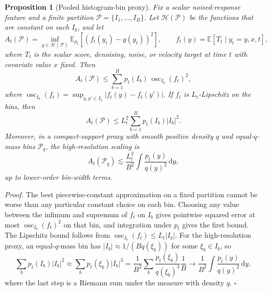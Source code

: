 \documentclass{article}
\newcommand{\E}{\mathbb{E}}
\newcommand{\dd}{\mathrm{d}}
\newtheorem{proposition}{Proposition}
\begin{document}
\begin{proposition}[Pooled histogram-bin proxy]\label{prop:histogram-bins}
Fix a scalar noised-response feature and a finite partition $\mathcal{P}=\{I_1,\ldots,I_B\}$. Let $\mathcal{H}(\mathcal{P})$ be the functions that are constant on each $I_b$, and let
\[
A_t(\mathcal{P})
=
\inf_{g\in\mathcal{H}(\mathcal{P})}
  \E_{p_t}\!\left[(f_t(y_t)-g(y_t))^2\right],
\qquad
f_t(y)=\E[T_t\mid y_t=y,x,t],
\]
where $T_t$ is the scalar score, denoising, noise, or velocity target at time $t$ with covariate value $x$ fixed. Then
\[
A_t(\mathcal{P})
\leq
\sum_{b=1}^B p_t(I_b)\,
  \operatorname{osc}_{I_b}(f_t)^2,
\]
where $\operatorname{osc}_{I_b}(f_t)=\sup_{y,y'\in I_b}|f_t(y)-f_t(y')|$. If $f_t$ is $L_t$-Lipschitz on the bins, then
\[
A_t(\mathcal{P}) \leq L_t^2\sum_{b=1}^B p_t(I_b)|I_b|^2.
\]
Moreover, in a compact-support proxy with smooth positive density $q$ and equal-$q$-mass bins $\mathcal{P}_q$, the high-resolution scaling is
\[
A_t(\mathcal{P}_q)
\lesssim
\frac{L_t^2}{B^2}\int \frac{p_t(y)}{q(y)^2}\,\dd y,
\]
up to lower-order bin-width terms.
\end{proposition}
\emph{Proof.} The best piecewise-constant approximation on a fixed partition cannot be worse than any particular constant choice on each bin. Choosing any value between the infimum and supremum of $f_t$ on $I_b$ gives pointwise squared error at most $\operatorname{osc}_{I_b}(f_t)^2$ on that bin, and integration under $p_t$ gives the first bound. The Lipschitz bound follows from $\operatorname{osc}_{I_b}(f_t)\leq L_t|I_b|$. For the high-resolution proxy, an equal-$q$-mass bin has $|I_b|\approx 1/(B q(\xi_b))$ for some $\xi_b\in I_b$, so
\[
\sum_b p_t(I_b)|I_b|^2
\approx
\sum_b p_t(\xi_b)|I_b|^3
=\frac{1}{B^2}\sum_b \frac{p_t(\xi_b)}{q(\xi_b)^3}\frac{1}{B}
\to \frac{1}{B^2}\int \frac{p_t(y)}{q(y)^2}\,\dd y,
\]
where the last step is a Riemann sum under the measure with density $q$. \hfill$\square$
\end{document}

